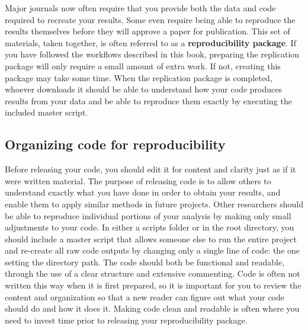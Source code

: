 Major journals now often require that you provide both the data and code required to recreate your results.
Some even require being able to reproduce the results themselves
before they will approve a paper for publication.
This set of materials, taken together,
is often referred to as a \textbf{reproducibility package}.
If you have followed the workflows described in this book,
preparing the replication package will only require a small amount of extra work.
If not, creating this package may take some time.
When the replication package is completed,
whoever downloads it should be able
to understand how your code produces results from your data
and be able to reproduce them exactly by executing the included master script.

\subsection{Organizing code for reproducibility}

Before releasing your code, you should edit it for content and clarity
just as if it were written material.
The purpose of releasing code is to allow others to understand
exactly what you have done in order to obtain your results,
and enable them to apply similar methods in future projects.
Other researchers should be able to reproduce individual portions of your analysis
by making only small adjustments to your code.
In either a scripts folder or in the root directory,
you should include a master script that allows someone else to run the entire project
and re-create all raw code outputs by changing only a single line of code:
the one setting the directory path.
The code should both be functional and readable,
through the use of a clear structure and extensive commenting.
Code is often not written this way when it is first prepared,
so it is important for you to review the content and organization
so that a new reader can figure out what your code should do and how it does it.
Making code clean and readable is often where you need to invest time prior to releasing your reproducibility package.

